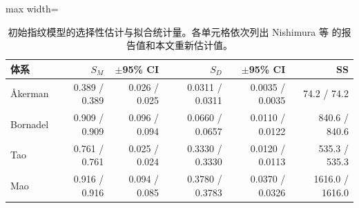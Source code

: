 \begin{table}[t]
\centering
\caption{初始指纹模型的选择性估计与拟合统计量。各单元格依次列出 Nishimura 等 \cite{nishimura2026} 的报告值和本文重新估计值。}\label{tab:reprofp}
\footnotesize
\begin{adjustbox}{max width=\linewidth}
\begin{tabular}{lrrrrr}
\toprule
体系 & $S_M$ & $\pm$95\% CI & $S_D$ & $\pm$95\% CI & SS \\
\midrule
Åkerman & 0.389 / 0.389 & 0.026 / 0.025 & 0.0311 / 0.0311 & 0.0035 / 0.0035 & 74.2 / 74.2 \\
Bornadel & 0.909 / 0.909 & 0.096 / 0.094 & 0.0660 / 0.0657 & 0.0110 / 0.0122 & 840.6 / 840.6 \\
Tao & 0.761 / 0.761 & 0.025 / 0.024 & 0.3330 / 0.3330 & 0.0120 / 0.0113 & 535.3 / 535.3 \\
Mao & 0.916 / 0.916 & 0.094 / 0.085 & 0.3780 / 0.3783 & 0.0370 / 0.0326 & 1616.0 / 1616.0 \\
\bottomrule
\end{tabular}
\end{adjustbox}
\end{table}
